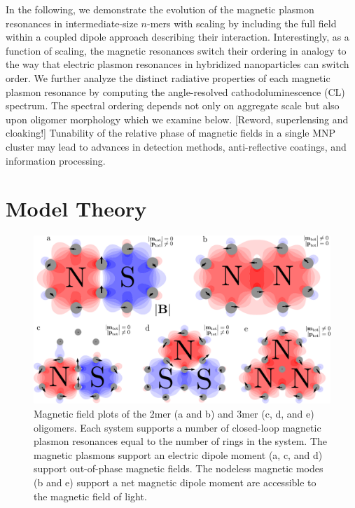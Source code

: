\documentclass[journal=apchd5,manuscript=article]{achemso}
\begin{document}
In the following, we demonstrate the evolution of the magnetic plasmon resonances in intermediate-size $n$-mers with scaling by including the full field within a coupled dipole approach describing their interaction. Interestingly, as a function of scaling, the magnetic resonances switch their ordering in analogy to the way that electric plasmon resonances in hybridized nanoparticles can switch order\cite{vonPlessen2007}. We further analyze the distinct radiative properties of each magnetic plasmon resonance by computing the angle-resolved cathodoluminescence (CL) spectrum\cite{Hohenester2012,Coenen2011,CoPol2011,Polman2014}. The spectral ordering depends not only on aggregate scale but also upon oligomer morphology which we examine below. [Reword, superlensing and cloaking!] Tunability of the relative phase of magnetic fields in a single MNP cluster may lead to advances in detection methods\cite{Zia2010trans,Noginova2008trans,Wang:13,Fan2015,Wei2015,Shvets2012,Altug2012bio,Nord2011fano}, anti-reflective coatings\cite{Alu2006,Alu2008}, and information processing\cite{NordHal2011,NordHal2012}.

\section{Model Theory}

\begin{figure}
\includegraphics[width=6.5in]{2mer_3mer_fields.pdf}
\caption{Magnetic field plots of the 2mer (a and b) and 3mer (c, d, and e) oligomers. Each system supports a number of closed-loop magnetic plasmon resonances equal to the number of rings in the system. The magnetic plasmons support an electric dipole moment (a, c, and d) support out-of-phase magnetic fields. The nodeless magnetic modes (b and e) support a net magnetic dipole moment are accessible to the magnetic field of light.}
\label{field_plots}
\end{figure}
\end{document}
